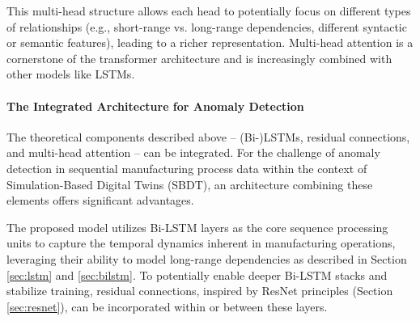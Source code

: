 This multi-head structure allows each head to potentially focus on different types of relationships (e.g., short-range vs. long-range dependencies, different syntactic or semantic features), leading to a richer representation. Multi-head attention is a cornerstone of the transformer architecture \autocite{vaswani2017attention} and is increasingly combined with other models like LSTMs.

\paragraph{\textbf{The Integrated Architecture for Anomaly Detection}}
\label{sec:integrated_architecture}

The theoretical components described above -- (Bi-)LSTMs, residual connections, and multi-head attention -- can be integrated. For the challenge of anomaly detection in sequential manufacturing process data within the context of Simulation-Based Digital Twins (SBDT), an architecture combining these elements offers significant advantages.

The proposed model utilizes Bi-LSTM layers as the core sequence processing units to capture the temporal dynamics inherent in manufacturing operations, leveraging their ability to model long-range dependencies as described in Section \autoref{sec:lstm} and \autoref{sec:bilstm}. To potentially enable deeper Bi-LSTM stacks and stabilize training, residual connections, inspired by ResNet principles (Section \autoref{sec:resnet}), can be incorporated within or between these layers.

